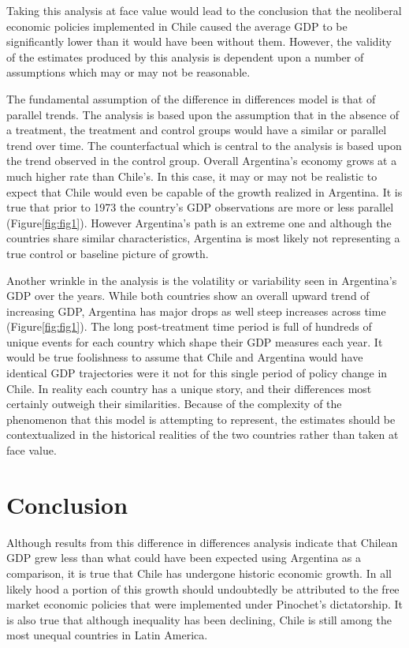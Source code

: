 \documentclass[12pt,english]{article}
\begin{document}
Taking this analysis at face value would lead to the conclusion that the neoliberal economic policies implemented in Chile caused the average GDP to be significantly lower than it would have been without them. However, the validity of the estimates produced by this analysis is dependent upon a number of assumptions which may or may not be reasonable. 

The fundamental assumption of the difference in differences model is that of parallel trends. The analysis is based upon the assumption that in the absence of a treatment, the treatment and control groups would have a similar or parallel trend over time. The counterfactual which is central to the analysis is based upon the trend observed in the control group. 
Overall Argentina's economy grows at a much higher rate than Chile's. In this case, it may or may not be realistic to expect that Chile would even be capable of the growth realized in Argentina. It is true that prior to 1973 the country's GDP observations are more or less parallel (Figure\ref{fig:fig1}). However Argentina's path is an extreme one and although the countries share similar characteristics, Argentina is most likely not representing a true control or baseline picture of growth. 

Another wrinkle in the analysis is the volatility or variability seen in Argentina's GDP over the years. While both countries show an overall upward trend of increasing GDP, Argentina has major drops as well steep increases across time (Figure\ref{fig:fig1}). The long post-treatment time period is full of hundreds of unique events for each country which shape their GDP measures each year. It would be true foolishness to assume that Chile and Argentina would have identical GDP trajectories were it not for this single period of policy change in Chile. In reality each country has a unique story, and their differences most certainly outweigh their similarities. Because of the complexity of the phenomenon that this model is attempting to represent, the estimates should be contextualized in the historical realities of the two countries rather than taken at face value. 






\section{Conclusion}\label{sec:conclusion}

Although results from this difference in differences analysis indicate that Chilean GDP grew less than what could have been expected using Argentina as a comparison, it is true that Chile has undergone historic economic growth. In all likely hood a portion of this growth should undoubtedly be attributed to the free market economic policies that were implemented under Pinochet's dictatorship. It is also true that although inequality has been declining, Chile is still among the most unequal countries in Latin America. 
\end{document}
